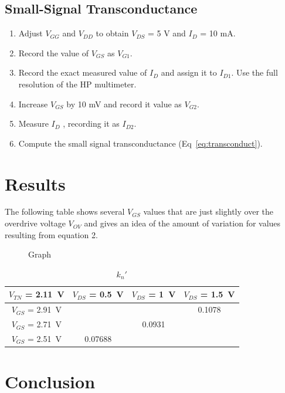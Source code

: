 \subsection{Small-Signal Transconductance}
\label{sec:nand}

\begin{enumerate}
\item Adjust $V_{GG}$ and $V_{DD}$ to obtain $V_{DS}$ = 5 V and $I_D$ = 10 mA.
\item Record the value of $V_{GS}$ as $V_{G1}$.
\item Record the exact measured value of $I_D$ and assign it to $I_{D1}$. Use the full resolution of the HP multimeter.
\item Increase $V_{GS}$ by 10 mV and record it value as $V_{G2}$.
\item Measure $I_D$ , recording it as $I_{D2}$.
\item Compute the small signal transconductance (Eq~\ref{eq:transconduct}).
\end{enumerate}

\section{Results}
\label{sec:results}

The following table shows several $V_{GS}$ values that are just slightly over the overdrive voltage $V_{OV}$ and gives an idea of the amount of variation for values resulting from equation 2.

\begin{figure}[hbtp]
  \centering
  \resizebox{1.0\textwidth}{!}{}
  \caption{\label{fig:graph} Graph}
\end{figure}

\begin{table}[hbtp]
  \centering
  \begin{tabular}{c|ccc}
    $V_{TN}$ = \SI{2.11}{V} & $V_{DS}$ = \SI{0.5}{V} & $V_{DS}$ = \SI{1}{V} & $V_{DS}$ = \SI{1.5}{V} \\
    \hline
    $V_{GS}$ = \SI{2.91}{V} & & & 0.1078 \\
    $V_{GS}$ = \SI{2.71}{V} & & 0.0931 & \\
    $V_{GS}$ = \SI{2.51}{V} & 0.07688 & & \\
  \end{tabular}
  \caption{\label{tab:kn} $k_n'$}
\end{table}

\section{Conclusion}
\label{sec:conclusion}

